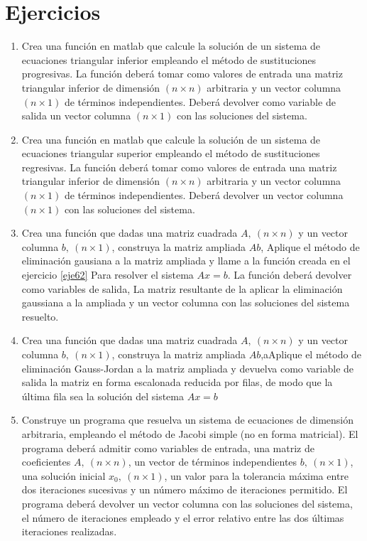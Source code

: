 \section{Ejercicios}
\begin{enumerate}
\item Crea una función en matlab que calcule la solución de un sistema de ecuaciones triangular inferior empleando el método de sustituciones progresivas. La función deberá tomar como valores de entrada una matriz triangular inferior de dimensión $(n\times n)$ arbitraria y un vector columna $(n\times 1)$ de términos independientes. Deberá devolver como variable de salida un vector columna $(n\times 1)$ con las soluciones del sistema.

\item \label{eje62} Crea una función en matlab que calcule la solución de un sistema de ecuaciones triangular superior empleando el método de sustituciones regresivas. La función deberá tomar como valores de entrada una matriz triangular inferior de dimensión $(n\times n)$ arbitraria y un vector columna $(n\times 1)$ de términos independientes. Deberá devolver un vector columna $(n\times 1)$ con las soluciones del sistema.

\item Crea una función que dadas una matriz cuadrada  $ A,\ (n\times n)$ y un  vector columna $b,\ (n\times 1)$, construya la matriz ampliada $Ab$, Aplique el método de eliminación gausiana a la matriz ampliada y llame a la función creada en el ejercicio \ref{eje62} Para resolver el sistema $Ax=b$. La función deberá devolver como variables de salida, La matriz resultante de la aplicar la eliminación gaussiana a la ampliada y un vector columna con las soluciones del sistema resuelto. 

\item Crea una función que dadas una matriz cuadrada  $ A,\ (n\times n)$ y un  vector columna $b,\ (n\times 1)$, construya la matriz ampliada $Ab$,aAplique el método de eliminación Gauss-Jordan a la matriz ampliada y devuelva como variable de salida la matriz en forma escalonada reducida por filas, de modo que la última fila sea la solución del sistema $Ax=b$  

\item Construye un programa que resuelva un sistema de ecuaciones de dimensión arbitraria, empleando el método de Jacobi simple (no en forma matricial). El programa deberá admitir como variables de entrada, una matriz de coeficientes $ A,\ (n\times n)$, un vector de términos independientes $b,\ (n\times 1)$, una solución inicial $x_0 ,\ (n\times 1)$, un valor para la tolerancia máxima entre dos iteraciones sucesivas y un número máximo de iteraciones permitido. El programa deberá devolver un vector columna con las soluciones del sistema, el número de iteraciones empleado y el error relativo entre las dos últimas iteraciones realizadas.


\end{enumerate}
